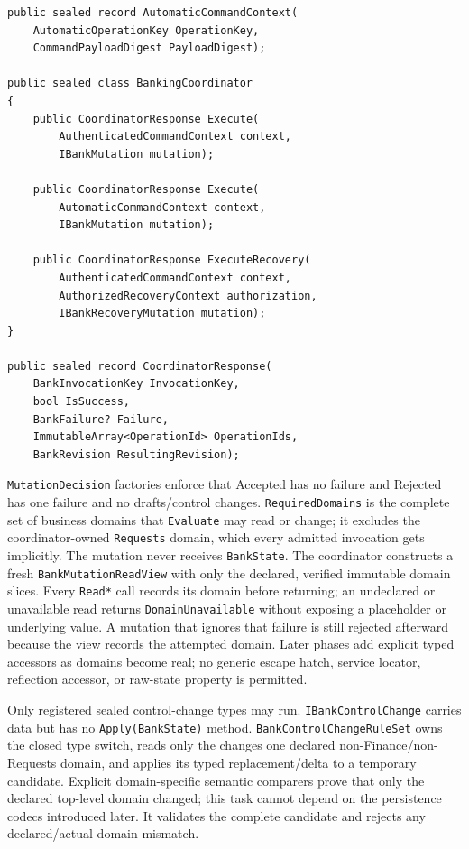 \documentclass[
  10pt,
  letterpaper,
]{article}
\newcommand{\passthrough}[1]{#1}
\begin{document}
\begin{lstlisting}
public sealed record AutomaticCommandContext(
    AutomaticOperationKey OperationKey,
    CommandPayloadDigest PayloadDigest);

public sealed class BankingCoordinator
{
    public CoordinatorResponse Execute(
        AuthenticatedCommandContext context,
        IBankMutation mutation);

    public CoordinatorResponse Execute(
        AutomaticCommandContext context,
        IBankMutation mutation);

    public CoordinatorResponse ExecuteRecovery(
        AuthenticatedCommandContext context,
        AuthorizedRecoveryContext authorization,
        IBankRecoveryMutation mutation);
}

public sealed record CoordinatorResponse(
    BankInvocationKey InvocationKey,
    bool IsSuccess,
    BankFailure? Failure,
    ImmutableArray<OperationId> OperationIds,
    BankRevision ResultingRevision);
\end{lstlisting}

\passthrough{\lstinline!MutationDecision!} factories enforce that
Accepted has no failure and Rejected has one failure and no
drafts/control changes. \passthrough{\lstinline!RequiredDomains!} is the
complete set of business domains that \passthrough{\lstinline!Evaluate!}
may read or change; it excludes the coordinator-owned
\passthrough{\lstinline!Requests!} domain, which every admitted
invocation gets implicitly. The mutation never receives
\passthrough{\lstinline!BankState!}. The coordinator constructs a fresh
\passthrough{\lstinline!BankMutationReadView!} with only the declared,
verified immutable domain slices. Every \passthrough{\lstinline!Read*!}
call records its domain before returning; an undeclared or unavailable
read returns \passthrough{\lstinline!DomainUnavailable!} without
exposing a placeholder or underlying value. A mutation that ignores that
failure is still rejected afterward because the view records the
attempted domain. Later phases add explicit typed accessors as domains
become real; no generic escape hatch, service locator, reflection
accessor, or raw-state property is permitted.

Only registered sealed control-change types may run.
\passthrough{\lstinline!IBankControlChange!} carries data but has no
\passthrough{\lstinline!Apply(BankState)!} method.
\texttt{BankControlChangeRuleSet} owns the closed type switch, reads
only the change\textquotesingle s one declared non-Finance/non-Requests
domain, and applies its typed replacement/delta to a temporary
candidate. Explicit domain-specific semantic comparers prove that only
the declared top-level domain changed; this task cannot depend on the
persistence codecs introduced later. It validates the complete candidate
and rejects any declared/actual-domain mismatch.
\end{document}
